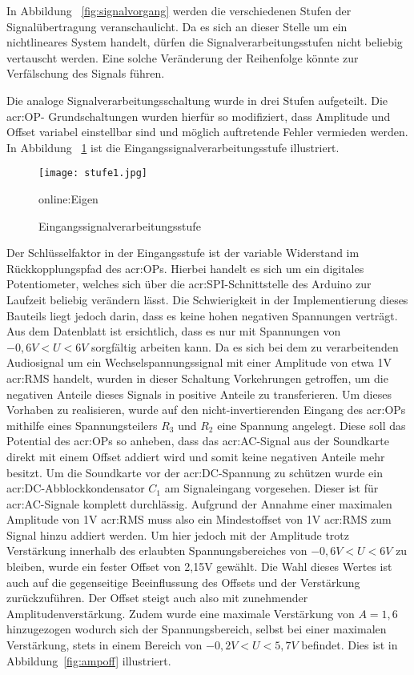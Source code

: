 In Abbildung ~\ref{fig:signalvorgang} werden die verschiedenen Stufen der Signalübertragung veranschaulicht. Da es sich an dieser Stelle um ein nichtlineares System handelt, dürfen die Signalverarbeitungsstufen nicht beliebig vertauscht werden. Eine solche Veränderung der Reihenfolge könnte zur Verfälschung des Signals führen. 

Die analoge Signalverarbeitungsschaltung wurde in drei Stufen aufgeteilt. Die \gls{acr:OP}- Grundschaltungen wurden hierfür so modifiziert, dass Amplitude und Offset variabel einstellbar sind und möglich auftretende Fehler vermieden werden. In Abbildung ~\ref{fig:stufe1} ist die Eingangssignalverarbeitungsstufe illustriert. 

\begin{figure}[H]
	\centering
	\texttt{[image: stufe1.jpg]}
	\caption[Eingangssignalverarbeitungsstufe]{Eingangssignalverarbeitungsstufe} \gls{online:Eigen}
	\label{fig:stufe1}
\end{figure}

Der Schlüsselfaktor in der Eingangsstufe ist der variable Widerstand im Rückkopplungspfad des \gls{acr:OP}s. Hierbei handelt es sich um ein digitales Potentiometer, welches sich über die \gls{acr:SPI}-Schnittstelle des Arduino zur Laufzeit beliebig verändern lässt. Die Schwierigkeit in der Implementierung dieses Bauteils liegt jedoch darin, dass es keine hohen negativen Spannungen verträgt. Aus dem Datenblatt ist ersichtlich, dass es nur mit Spannungen von $-0,6V<U<6V$ sorgfältig arbeiten kann. Da es sich bei dem zu verarbeitenden Audiosignal um ein Wechselspannungssignal mit einer Amplitude von etwa 1V \gls{acr:RMS} handelt, wurden in dieser Schaltung Vorkehrungen getroffen, um die negativen Anteile dieses Signals in positive Anteile zu transferieren. Um dieses Vorhaben zu realisieren, wurde auf den nicht-invertierenden Eingang des \gls{acr:OP}s mithilfe eines Spannungsteilers $R_{3}$ und $R_{2}$ eine Spannung angelegt. Diese soll das Potential des \gls{acr:OP}s so anheben, dass das \gls{acr:AC}-Signal aus der Soundkarte direkt mit einem Offset addiert wird und somit keine negativen Anteile mehr besitzt. Um die Soundkarte vor der \gls{acr:DC}-Spannung zu schützen wurde ein \gls{acr:DC}-Abblockkondensator $C_{1}$ am Signaleingang vorgesehen. Dieser ist für \gls{acr:AC}-Signale komplett durchlässig. Aufgrund der Annahme einer maximalen Amplitude von 1V \gls{acr:RMS} muss also ein Mindestoffset von 1V \gls{acr:RMS} zum Signal hinzu addiert werden. Um hier jedoch mit der Amplitude trotz Verstärkung innerhalb des erlaubten Spannungsbereiches von $-0,6V<U<6V$ zu bleiben, wurde ein fester Offset von 2,15V gewählt. Die Wahl dieses Wertes ist auch auf die gegenseitige Beeinflussung des Offsets und der Verstärkung zurückzuführen. Der Offset steigt auch also mit zunehmender Amplitudenverstärkung. Zudem wurde eine maximale Verstärkung von $A=1,6$ hinzugezogen wodurch sich der Spannungsbereich, selbst bei einer maximalen Verstärkung, stets in einem Bereich von $-0,2V<U<5,7V$ befindet. Dies ist in Abbildung~\ref{fig:ampoff} illustriert.


